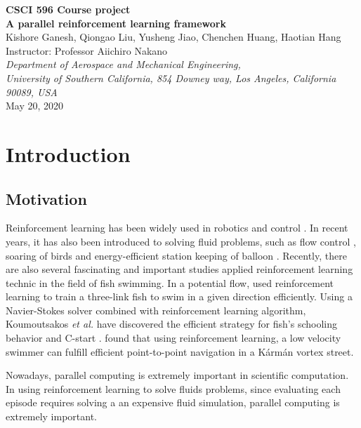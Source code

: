\documentclass[12Pt]{article}
\begin{document}
\begin{center}
{\bf \Large{CSCI 596 Course project}} \\[2ex]
{\bf \Large{A parallel reinforcement learning framework}} \\[2ex]
{Kishore Ganesh, Qiongao Liu, Yusheng Jiao, Chenchen Huang, Haotian Hang}\\[2ex]
{Instructor: Professor Aiichiro Nakano}\\[2ex]
{\textit{Department of Aerospace and Mechanical Engineering,  \\ University of Southern California, 854 Downey way, Los Angeles, California 90089, USA
}}\\[2ex]
May 20, 2020\\

\vspace{0.1in}

\end{center}



\section{Introduction}\label{sec:intro}
\subsection{Motivation}\label{sec:moti}
Reinforcement learning has been widely used in robotics and control \citep{Schulman2017,Ng2003,Hwangbo2017,Xu2019,Ma2021}. In recent years, it has also been introduced to solving fluid problems, such as flow control \cite{Tedrake2009,Ma2018,Rabault2019,Fan2020,Garnier2021}, soaring of birds \cite{Reddy2016,Reddy2018} and energy-efficient station keeping of balloon \cite{Bellemare2020}.
Recently, there are also several fascinating and important studies applied reinforcement learning technic in the field of fish swimming. 
In a potential flow, \cite{Jiao2021} used reinforcement learning to train a three-link fish to swim in a given direction efficiently. Using a Navier-Stokes solver combined with reinforcement learning algorithm, Koumoutsakos \textit{et al.} have discovered the efficient strategy for fish's schooling behavior \cite{Gazzola2014,Verma2018} and C-start \cite{Mandralis2021}. \cite{Gunnarson2021} found that using reinforcement learning, a low velocity swimmer can fulfill efficient point-to-point navigation in a  K{\'a}rm{\'a}n vortex street. 

Nowadays, parallel computing is extremely important in scientific computation. In using reinforcement learning to solve fluids problems, since evaluating each episode requires solving a an expensive fluid simulation, parallel computing is extremely important. 
\end{document}
